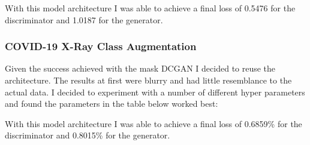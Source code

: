 \begin{table}[H]
    \centering
    \caption{DCGAN for Producing Synthetic COVID-19 Mask Data From Radiography Dataset }
    \label{tab:DCGAN for Producing Synthetic COVID-19 Mask Data From Radiography Dataset}
\end{table}
With this model architecture I was able to achieve a final loss of 0.5476 for the discriminator and 1.0187 for the generator.
\subsubsection{COVID-19 X-Ray Class Augmentation}
Given the success achieved with the mask DCGAN I decided to reuse the architecture.  The results at first were blurry and had little resemblance to the actual data.  I decided to experiment with a number of different hyper parameters and found the parameters in the table below worked best:
\begin{table}[H]
    \centering
    \caption{DCGAN for Producing Synthetic COVID-19 X-Ray Data From Radiography Dataset }
    \label{tab:DCGAN for Producing Synthetic COVID-19 X-Ray Data From Radiography Dataset}
\end{table}
With this model architecture I was able to achieve a final loss of 0.6859\% for the discriminator and 0.8015\% for the generator.
